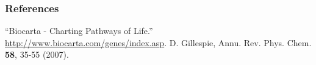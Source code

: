 \documentclass[xcolor={usenames,dvipsnames,svgnames}]{beamer}
\begin{document}
\appendix

\begin{frame}
    \frametitle{References}
    \begin{thebibliography}{9}
         ``Biocarta - Charting Pathways of Life.'' \url{http://www.biocarta.com/genes/index.asp}.
         D. Gillespie, Annu. Rev. Phys. Chem. \textbf{58}, 35-55 (2007).
        
    \end{thebibliography}
\end{frame}
\end{document}
